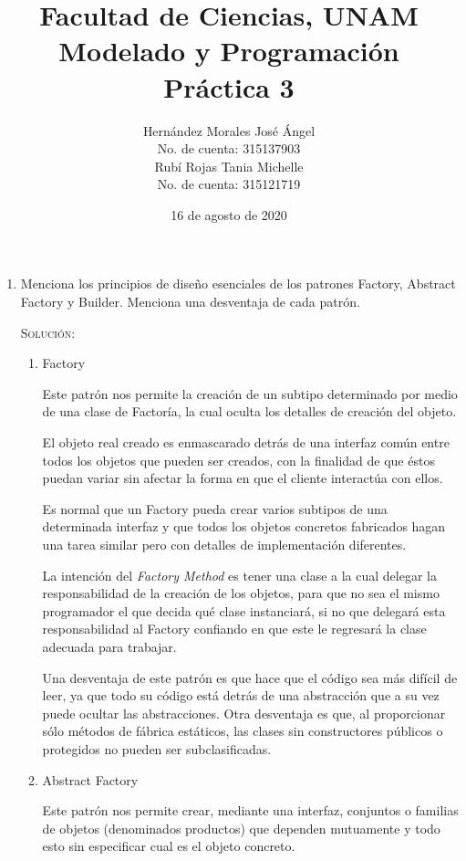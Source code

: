 \documentclass[letterpaper,11pt]{article}
\title{Facultad de Ciencias, UNAM \\ Modelado y Programación \\ Práctica 3}
\author{Hernández Morales José Ángel \\ No. de cuenta: 315137903 \\ 
        Rubí Rojas Tania Michelle \\ No. de cuenta: 315121719}
\date{16 de agosto de 2020}
\begin{document}
\maketitle

\begin{enumerate}
    \item Menciona los principios de diseño esenciales de los patrones Factory, 
    Abstract Factory y Builder. Menciona una desventaja de cada patrón.

    \textsc{Solución:}
    \begin{enumerate}
        \item Factory
        
        Este patrón nos permite la creación de un subtipo determinado por medio 
        de una clase de Factoría, la cual oculta los detalles de creación del 
        objeto. 

        El objeto real creado es enmascarado detrás de una interfaz común entre 
        todos los objetos que pueden ser creados, con la finalidad de que éstos 
        puedan variar sin afectar la forma en que el cliente interactúa con 
        ellos. 

        Es normal que un Factory pueda crear varios subtipos de una determinada 
        interfaz y que todos los objetos concretos fabricados hagan una tarea 
        similar pero con detalles de implementación diferentes.

        La intención del \textit{Factory Method} es tener una clase a la cual 
        delegar la responsabilidad de la creación de los objetos, para que no 
        sea el mismo programador el que decida qué clase instanciará, si no 
        que delegará esta responsabilidad al Factory confiando en que este 
        le regresará la clase adecuada para trabajar. 

        Una desventaja de este patrón es que hace que el código sea más difícil
        de leer, ya que todo su código está detrás de una abstracción que a su 
        vez puede ocultar las abstracciones. Otra desventaja es que, al 
        proporcionar sólo métodos de fábrica estáticos, las clases sin 
        constructores públicos o protegidos no pueden ser subclasificadas. 

        \item Abstract Factory
        
        Este patrón nos permite crear, mediante una interfaz, conjuntos o 
        familias de objetos (denominados productos) que dependen mutuamente y 
        todo esto sin especificar cual es el objeto concreto. 
        

\end{enumerate}
\end{enumerate}
\end{document}
